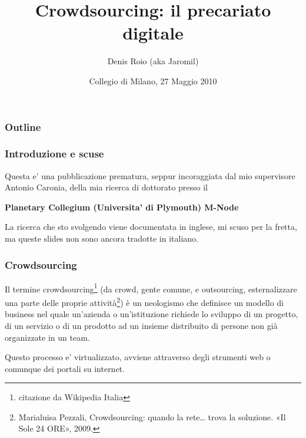 \documentclass{beamer}
\institute[2010]{dyne.org / NIMk}
\title{Crowdsourcing: il precariato digitale}
\author{Denis Roio (aka Jaromil)}
\date{Collegio di Milano, 27 Maggio 2010}
\begin{document}
\maketitle

\begin{frame}
\frametitle{Outline}
\setcounter{tocdepth}{3}
\tableofcontents
\end{frame}






\begin{frame}
\frametitle{Introduzione e scuse}
\label{sec-1}


Questa e' una pubblicazione prematura, seppur incoraggiata dal mio
supervisore Antonio Caronia, della mia ricerca di dottorato presso il

\textbf{Planetary Collegium (Universita' di Plymouth) M-Node}

La ricerca che sto svolgendo viene documentata in inglese, mi scuso
per la fretta, ma queste slides non sono ancora tradotte in italiano.
\end{frame}
\begin{frame}
\frametitle{Crowdsourcing}
\label{sec-2}


Il termine crowdsourcing\footnote{citazione da Wikipedia Italia } (da crowd, gente comune, e
outsourcing, esternalizzare una parte delle proprie attività\footnote{Marialuisa Pezzali, Crowdsourcing: quando la rete\ldots{} trova la
soluzione. «Il Sole 24 ORE», 2009. }) è
un neologismo che definisce un modello di business nel quale
un’azienda o un’istituzione richiede lo sviluppo di un progetto, di un
servizio o di un prodotto ad un insieme distribuito di persone non già
organizzate in un team.

Questo processo e' virtualizzato, avviene attraverso degli strumenti
web o comunque dei portali su internet.
\end{frame}
\end{document}
